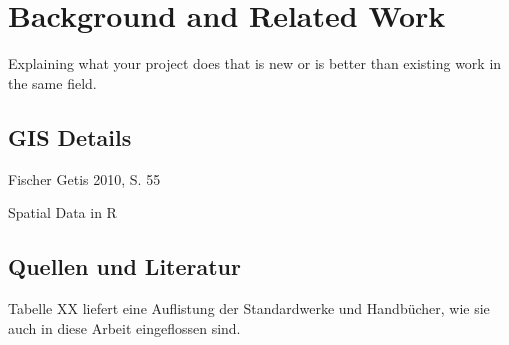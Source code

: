 \chapter{Background and Related Work}\label{ch:background} 

Explaining what your project does that is new or is better than existing work in the same field.

\section{GIS Details}

Fischer Getis 2010, S. 55 

Spatial Data in R
\section{Quellen und Literatur}

Tabelle XX liefert eine Auflistung der Standardwerke und Handbücher, wie sie auch in diese Arbeit eingeflossen sind.